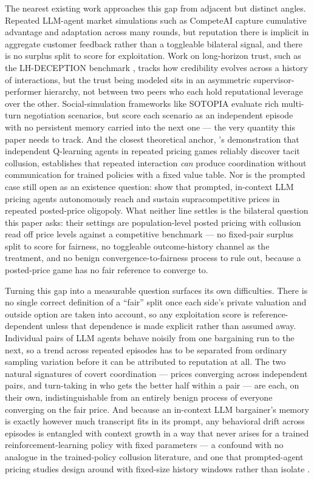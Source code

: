 \documentclass[11pt]{article}
\begin{document}
The nearest existing work approaches this gap from adjacent but distinct angles. Repeated LLM-agent market simulations such as CompeteAI \citep{competeai} capture cumulative advantage and adaptation across many rounds, but reputation there is implicit in aggregate customer feedback rather than a toggleable bilateral signal, and there is no surplus split to score for exploitation. Work on long-horizon trust, such as the LH-DECEPTION benchmark \citep{lhdeception}, tracks how credibility evolves across a history of interactions, but the trust being modeled sits in an asymmetric supervisor-performer hierarchy, not between two peers who each hold reputational leverage over the other. Social-simulation frameworks like SOTOPIA \citep{sotopia} evaluate rich multi-turn negotiation scenarios, but score each scenario as an independent episode with no persistent memory carried into the next one --- the very quantity this paper needs to track. And the closest theoretical anchor, \citet{calvano2020}'s demonstration that independent Q-learning agents in repeated pricing games reliably discover tacit collusion, establishes that repeated interaction \emph{can} produce coordination without communication for trained policies with a fixed value table. Nor is the prompted case still open as an existence question: \citet{fish2024algorithmic} show that prompted, in-context LLM pricing agents autonomously reach and sustain supracompetitive prices in repeated posted-price oligopoly. What neither line settles is the bilateral question this paper asks: their settings are population-level posted pricing with collusion read off price levels against a competitive benchmark --- no fixed-pair surplus split to score for fairness, no toggleable outcome-history channel as the treatment, and no benign convergence-to-fairness process to rule out, because a posted-price game has no fair reference to converge to.

Turning this gap into a measurable question surfaces its own difficulties. There is no single correct definition of a ``fair'' split once each side's private valuation and outside option are taken into account, so any exploitation score is reference-dependent unless that dependence is made explicit rather than assumed away. Individual pairs of LLM agents behave noisily from one bargaining run to the next, so a trend across repeated episodes has to be separated from ordinary sampling variation before it can be attributed to reputation at all. The two natural signatures of covert coordination --- prices converging across independent pairs, and turn-taking in who gets the better half within a pair --- are each, on their own, indistinguishable from an entirely benign process of everyone converging on the fair price. And because an in-context LLM bargainer's memory is exactly however much transcript fits in its prompt, any behavioral drift across episodes is entangled with context growth in a way that never arises for a trained reinforcement-learning policy with fixed parameters --- a confound with no analogue in the trained-policy collusion literature, and one that prompted-agent pricing studies design around with fixed-size history windows rather than isolate \citep{fish2024algorithmic}.
\end{document}
